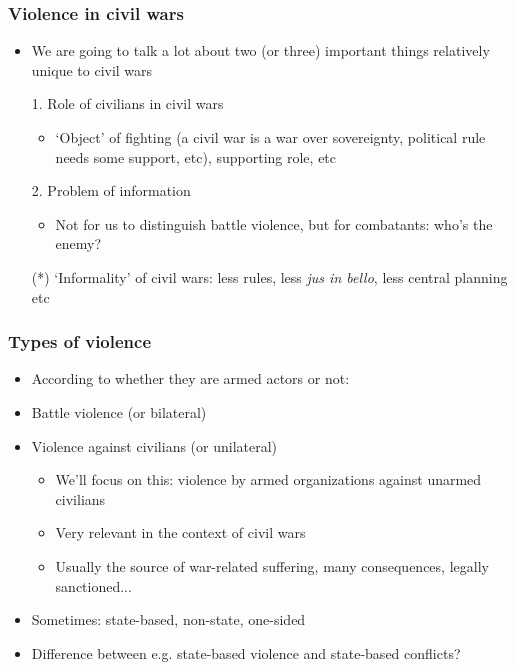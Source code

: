 \documentclass[utf8, xcolor=dvipsnames, handout]{beamer}
\begin{document}
\begin{frame}
\frametitle{Violence in civil wars}
\centering

\begin{itemize}[<+->]
  \item We are going to talk a lot about two (or three) important things relatively unique to civil wars
  \item[1.] Role of civilians in civil wars
  \begin{itemize}
    \item `Object' of fighting (a civil war is a war over sovereignty, political rule needs some support, etc), supporting role, etc
  \end{itemize}
  \item[2.] Problem of information
  \begin{itemize}
    \item Not for us to distinguish battle violence, but for combatants: who's the enemy?
  \end{itemize}
  \item[(*)] `Informality' of civil wars: less rules, less \textit{jus in bello}, less central planning etc
\end{itemize}

\end{frame}

\begin{frame}
\frametitle{Types of violence}
\centering

\begin{itemize}
  \item<1-> According to whether they are armed actors or not:
  \item<2->[-] Battle violence (or bilateral)
  \item<3->[-] Violence against civilians (or unilateral)
  \begin{itemize}
    \item<4-> We'll focus on this: violence by armed organizations against unarmed civilians
    \item<4-> Very relevant in the context of civil wars
    \item<4-> Usually the source of war-related suffering, many consequences, legally sanctioned...
  \end{itemize}
  \item[]
  \item<5-> Sometimes: state-based, non-state, one-sided
  \item<6-> Difference between e.g. state-based violence and state-based conflicts?
\end{itemize}

\end{frame}
\end{document}
